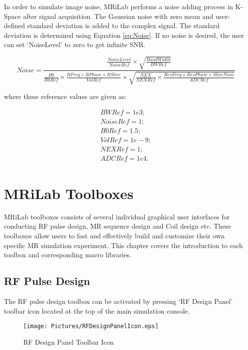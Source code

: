 \documentclass{book}%
\begin{document}
In order to simulate image noise, MRiLab performs a noise adding process in K-Space after signal acquisition. The Gaussian noise with zero mean and user-defined standard deviation is added to the complex signal. The standard deviation is determined using Equation \ref{eq:Noise}. If no noise is desired, the user can set `NoiseLevel' to zero to get infinite SNR.

\begin{equation}
Noise = \frac{\frac{NoiseLevel}{NoiseRef} \times \sqrt{\frac{BandWidth}{BWRef}}}{\frac{B0}{B0Ref} \times \frac{RFreq \times RPhase \times RSlice}{VolRef}
				\times \sqrt{\frac{NEX}{NEXRef} \times \frac{ResFreq \times ResPhase \times SliceNum}{ADCRef}}}
\label{eq:Noise}
\end{equation}

where these reference values are given as:

\begin{equation}
\begin{aligned}
	BWRef  = 1e3; \\
	NoiseRef = 1; \\
	B0Ref  = 1.5; \\
  VolRef = 1e-9; \\
	NEXRef = 1; \\
	ADCRef = 1e4. \\
\label{eq:Noise2}
\end{aligned}
\end{equation}

\chapter{MRiLab Toolboxes} \label{chap:MRiLabToolboxes}

MRiLab toolboxes consists of several individual graphical user interfaces for conducting RF pulse design, MR sequence design and Coil design etc. These toolboxes allow users to fast and effectively build and customize their own specific MR simulation experiment. This chapter covers the introduction to each toolbox and corresponding macro libraries.

\section{RF Pulse Design}

The RF pulse design toolbox can be activated by pressing `RF Design Panel' toolbar icon located at the top of the main simulation console.

\begin{figure}[htbp]
	\centering
		\texttt{[image: Pictures/RFDesignPanelIcon.eps]}
	\caption{RF Design Panel Toolbar Icon}
	\label{fig:RFDesignPanelIcon}
\end{figure}
\end{document}
